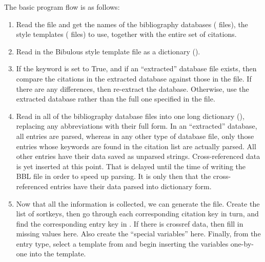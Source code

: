 \documentclass[letterpaper,10pt,english]{sphinxmanual}
\begin{document}
The basic program flow is as follows:
\begin{enumerate}
\item {} 
Read the  file and get the names of the bibliography databases ( files), the style templates ( files) to use, together with the entire set of citations.

\item {} 
Read in the Bibulous style template file as a dictionary ().

\item {} 
If the  keyword is set to True, and if an “extracted” database file exists, then compare the citations in the extracted database against those in the  file. If there are any differences, then re-extract the database. Otherwise, use the extracted database rather than the full one specified in the  file.

\item {} 
Read in all of the bibliography database files into one long dictionary (), replacing any abbreviations with their full form. In an “extracted” database, all entries are parsed, whereas in any other type of database file, only those entries whose keywords are found in the citation list are actually parsed. All other entries have their data saved as unparsed strings. Cross-referenced data is  yet inserted at this point. That is delayed until the time of writing the BBL file in order to speed up parsing. It is only then that the cross-referenced entries have their data parsed into dictionary form.

\item {} 
Now that all the information is collected, we can generate the  file. Create the list of sortkeys, then go through each corresponding citation key in turn, and find the corresponding entry key in . If there is crossref data, then fill in missing values here. Also create the “special variables” here. Finally, from the entry type, select a template from  and begin inserting the variables one-by-one into the template.

\end{enumerate}
\end{document}
